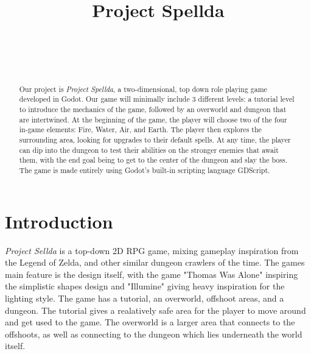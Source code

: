 \documentclass{sigchi}
\def\plaintitle{Project Spellda}
\def\plainkeywords{Authors' choice; of terms; separated; by
  semicolons; include commas, within terms only; this section is required.}
\begin{document}
\title{\plaintitle}

\author{%
  \\
  \\
  \\
}

\maketitle

\begin{abstract}
Our project is \emph{Project Spellda}, a two-dimensional, top down role playing game developed in Godot. Our game will minimally include 3 different levels: a tutorial level to introduce the mechanics of the game, followed by an overworld and dungeon that are intertwined. At the beginning of the game, the player will choose two of the four in-game elements: Fire, Water, Air, and Earth. The player then explores the surrounding area, looking for upgrades to their default spells. At any time, the player can dip into the dungeon to test their abilities on the stronger enemies that await them, with the end goal being to get to the center of the dungeon and slay the boss. The game is made entirely using Godot's built-in scripting language GDScript.
\end{abstract}





\section{Introduction}

\emph{Project Sellda} is a top-down 2D RPG game, mixing gameplay inspiration from the Legend of Zelda, and other similar dungeon crawlers of the time.
The games main feature is the design itself, with the game "Thomas Was Alone" inspiring the simplistic shapes design and "Illumine" giving heavy
inspiration for the lighting style. The game has a tutorial, an overworld, offshoot areas, and a dungeon. The tutorial gives a realatively safe area
for the player to move around and get used to the game. The overworld is a larger area that connects to the offshoots, as well as connecting to the
dungeon which lies underneath the world itself.
\end{document}

